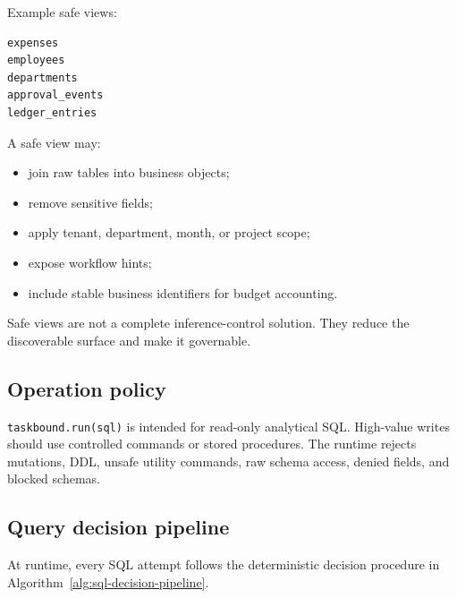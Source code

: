 \documentclass[
]{article}
\providecommand{\tightlist}{%
  \setlength{\itemsep}{0pt}\setlength{\parskip}{0pt}}
\begin{document}
Example safe views:

\begin{verbatim}
expenses
employees
departments
approval_events
ledger_entries
\end{verbatim}

A safe view may:

\begin{itemize}
\tightlist
\item
  join raw tables into business objects;
\item
  remove sensitive fields;
\item
  apply tenant, department, month, or project scope;
\item
  expose workflow hints;
\item
  include stable business identifiers for budget accounting.
\end{itemize}

Safe views are not a complete inference-control solution. They reduce
the discoverable surface and make it governable.

\hypertarget{operation-policy}{%
\subsection{Operation policy}\label{operation-policy}}

\texttt{taskbound.run(sql)} is intended for read-only analytical SQL.
High-value writes should use controlled commands or stored procedures.
The runtime rejects mutations, DDL, unsafe utility commands, raw schema
access, denied fields, and blocked schemas.

\hypertarget{query-decision-pipeline}{%
\subsection{Query decision
pipeline}\label{query-decision-pipeline}}

At runtime, every SQL attempt follows the deterministic decision
procedure in Algorithm~\ref{alg:sql-decision-pipeline}.
\end{document}
